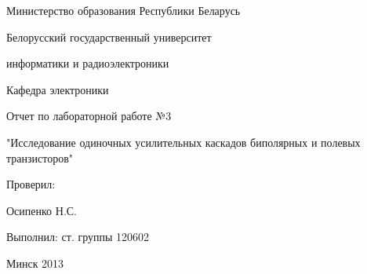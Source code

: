 \thispagestyle{empty}

\begin{center}
Министерство образования Республики Беларусь\par
\vspace{2mm}
Белорусский государственный университет\par
информатики и радиоэлектроники\par
\vspace{2mm}
Кафедра электроники\par

\end{center}

\vspace{50mm}

\begin{center}
Отчет по лабораторной работе №3\par
"Исследование одиночных усилительных каскадов биполярных и полевых транзисторов"\par
\end{center}

\vspace{40mm}

\begin{multicols}{2}
Проверил: 

Осипенко Н.С.
\vspace{40mm}

\begin{flushright}

Выполнил: ст. группы 120602

\end{flushright}
\end{multicols}

\vspace{50mm}
\begin{center}
{Минск 2013}
\end{center}

\newpage
